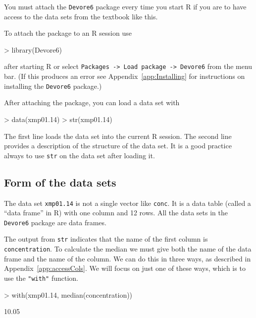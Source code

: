 \documentclass{book}
\begin{document}
You must attach the \texttt{Devore6} package every time you start R if
you are to have access to the data sets from the textbook like this.

To attach the package to an R session use
\begin{Schunk}
\begin{Sinput}
> library(Devore6)
\end{Sinput}
\end{Schunk}
after starting R or select \texttt{Packages -> Load package ->
  Devore6} from the menu bar.  (If this produces an error see
Appendix~\ref{app:Installing} for instructions on installing the
\texttt{Devore6} package.)

After attaching the package, you can load a data set with
\begin{Schunk}
\begin{Sinput}
> data(xmp01.14)
> str(xmp01.14)
\end{Sinput}
\end{Schunk}

The first line loads the data set into the current R session.  The
second line provides a description of the structure of the data set.
It is a good practice always to use \texttt{str} on the data set after
loading it.

\subsection*{Form of the data sets}
\label{sec:Form}

The data set \texttt{xmp01.14} is not a single vector like
\texttt{conc}.  It is a data table (called a ``data frame'' in R) with
one column and 12 rows.  All the data sets in the \texttt{Devore6}
package are data frames.

The output from \texttt{str} indicates that the name of the first
column is \texttt{concentration}.  To calculate the median we must
give both the name of the data frame and the name of the column.  We
can do this in three ways, as described in
Appendix~\ref{app:accessCols}.  We will focus on just one of these
ways, which is to use the \texttt{"with"} function.
\begin{Schunk}
\begin{Sinput}
> with(xmp01.14, median(concentration))
\end{Sinput}
\begin{Soutput}
[1] 10.05
\end{Soutput}
\end{Schunk}
\end{document}
